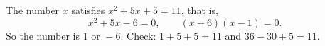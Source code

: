 The number $x$ satisfies $x^2+5x+5=11$, that is,
\[
x^2+5x-6=0,\qquad (x+6)(x-1)=0 .
\]
So the number is $\boxed{1\text{ or }-6}$. Check: $1+5+5=11$ and $36-30+5=11$.
